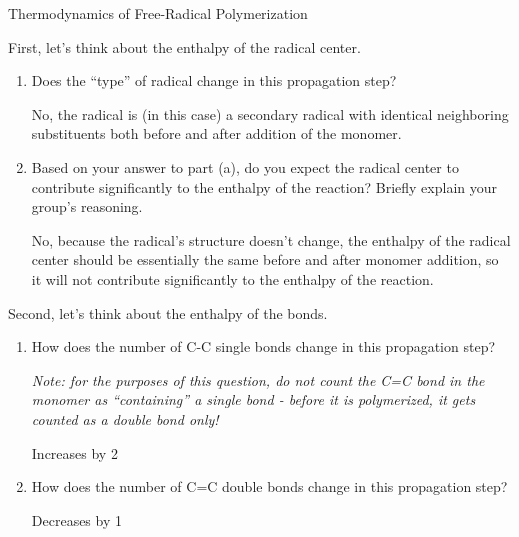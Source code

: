 \begin{activity}{Thermodynamics of Free-Radical Polymerization}
\begin{ctqs}

	\question First, let's think about the enthalpy of the radical center. \label{\labelbase:ctq:radicalenthalpy}
	
		\begin{enumerate}
		
			\item Does the ``type'' of radical change in this propagation step?
				
				\begin{solution}[0.5in]
					No, the radical is (in this case) a secondary radical with identical neighboring substituents both before and after addition of the monomer.
				\end{solution}
			
			\item Based on your answer to part (a), do you expect the radical center to contribute significantly to the enthalpy of the reaction?  Briefly explain your group's reasoning.
				
				\begin{solution}[1in]
					No, because the radical's structure doesn't change, the enthalpy of the radical center should be essentially the same before and after monomer addition, so it will not contribute significantly to the enthalpy of the reaction.
				\end{solution}
			
		\end{enumerate}
		
	\question Second, let's think about the enthalpy of the bonds. \label{\labelbase:ctq:bondenthalpy}
	
		\begin{enumerate}
			\item How does the number of C-C single bonds change in this propagation step?
			
				\emph{Note: for the purposes of this question, do not count the C=C bond in the monomer as ``containing'' a single bond - before it is polymerized, it gets counted as a double bond only!}
				
				\begin{solution}[0.75in]
					Increases by 2
				\end{solution}
			
			\item How does the number of C=C double bonds change in this propagation step?
				
				\begin{solution}[0.75in]
					Decreases by 1
				\end{solution}
			

\end{enumerate}
\end{ctqs}
\end{activity}

